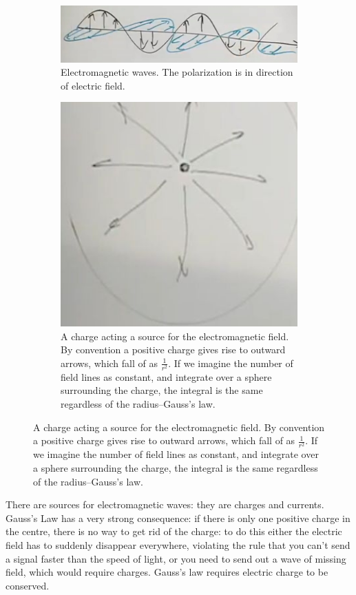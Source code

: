 \documentclass[]{article}
\begin{document}
\begin{figure}[H]
	\caption{The electromagnetic field}
	\begin{subfigure}[t]{0.45\textwidth}
		\caption{Electromagnetic waves. The polarization is in direction of electric field.}
		\includegraphics[width=\textwidth]{2-5-EM-field}
	\end{subfigure}
	\hfill
	\begin{subfigure}[t]{0.45\textwidth}
		\caption{A charge acting a source for the electromagnetic field. By convention a positive charge gives rise to outward arrows, which fall of as $\frac{1}{r^2}$. If we imagine the number of field lines as constant, and integrate over a sphere surrounding the charge, the integral is the same regardless of the radius--Gauss's law.}
		\includegraphics[width=\textwidth]{particles-2-5-electric-field}
	\end{subfigure}
\end{figure}

There are sources for electromagnetic waves: they are charges and currents. Gauss's Law has a very strong consequence: if there is only one positive charge in the centre, there is no way to get rid of the charge: to do this either the electric field has to suddenly disappear everywhere, violating the rule that you can't send a signal faster than the speed of light, or you need to send out a wave of missing field, which would require charges. Gauss's law requires electric charge to be conserved.
\end{document}
